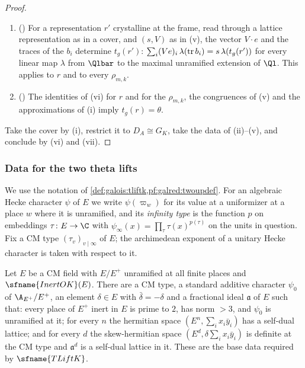\begin{proof}
\begin{enumerate}[label=(\roman*),nosep]
  invertible in $B_{\mathrm{cris}}$, and matrices $V$, $V'_m$ over $A_{\mathrm{cris}}$ such that $V\varphi^{n_2}(\Lambda)=s
  \varphi^{n_1}(\Lambda)$ for a matrix $\Lambda$ of crystalline periods of $\rho$, similarly for $V'_m$ and $\rho'_m$, and for
  every $M$ there is $m\ge M$ with $V\Pi_m\equiv\Pi_mV'_m\pmod{\ell^M}$.
\item () For a representation $r'$ crystalline at the frame,
  read through a lattice representation as in a cover, and $(s,V)$ as in (v), the vector $V\cdot e$ and the traces of the
  $b_i$ determine $t_g(r')$: $\sum_i(Ve)_i\,\lambda(\operatorname{tr} b_i)=s\,\lambda(t_g(r'))$ for every linear map $\lambda$ from
  $\Qlbar$ to the maximal unramified extension of $\Ql$. This applies to $r$ and to every $\rho_{m,k}$.
\item () The identities of (vi) for $r$ and for the
  $\rho_{m,k}$, the congruences of (v) and the approximations of (i) imply $t_g(r)=\theta$.
\end{enumerate}
Take the cover by (i), restrict it to $D_A\cong G_K$, take the data of (ii)--(v), and conclude by (vi) and (vii).
\end{proof}

\subsubsection{Data for the two theta lifts}

We use the notation of \cref{def:galois:tliftk,pf:galred:twoupdef}. For an algebraic Hecke character $\psi$ of $E$ we write
$\psi(\varpi_w)$ for its value at a uniformizer at a place $w$ where it is unramified, and its \emph{infinity type} is the
function $p$ on embeddings $\tau\colon E\to\C$ with $\psi_\infty(x)=\prod_\tau\tau(x)^{p(\tau)}$ on the units in question.
Fix a CM type $(\tau_v)_{v\mid\infty}$ of $E$; the archimedean exponent of a unitary Hecke character is taken with respect
to it.

\begin{proposition}\label{pf:galred:basedata}
Let $E$ be a CM field with $E/E^+$ unramified at all finite places and $\sfname{InertOK}(E)$. There are a CM type, a
standard additive character $\psi_0$ of $\A_{E^+}/E^+$, an element $\delta\in E$ with $\bar\delta=-\delta$ and a fractional
ideal $\mathfrak a$ of $E$ such that: every place of $E^+$ inert in $E$ is prime to $2$, has norm $>3$, and $\psi_0$ is
unramified at it; for every $n$ the hermitian space $(E^n,\sum_ix_i\bar y_i)$ has a self-dual lattice; and for every $d$
the skew-hermitian space $(E^d,\delta\sum_ix_i\bar y_i)$ is definite at the CM type and $\mathfrak a^d$ is a self-dual
lattice in it. These are the base data required by $\sfname{TLiftK}$.
\end{proposition}


